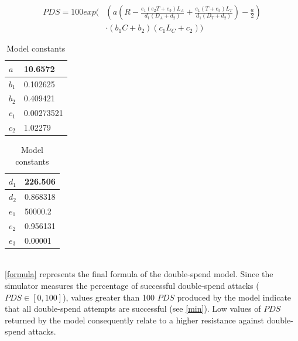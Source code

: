 \documentclass[a4paper,12pt,twoside]{report}
\begin{document}
\begin{equation}\label{formula}
\begin{split}
PDS = 100 exp \Biggl( & \left( a \left( R-\frac{e_1 \left( e_2T+e_3 \right) L_A}{d_1 \left( D_A+d_2 \right)}+\frac{e_1 \left( T+e_3 \right) L_T}{d_1 \left( D_T+d_2 \right)} \right) - \frac{a}{2} \right) \\
           & \cdot \left( b_1C+b_2 \right) \left( c_1L_C+c_2 \right) \Biggr)
\end{split}
\end{equation}
\begin{table}[hb!]
\centering
\begin{tabular}{|l|l|} \hline
$a$ & 10.6572 \\ \hline
$b_1$ & 0.102625 \\ \hline
$b_2$ & 0.409421 \\ \hline
$c_1$ & 0.00273521 \\ \hline
$c_2$ & 1.02279 \\ \hline
\end{tabular}
\begin{tabular}{|l|l|} \hline
$d_1$ & 226.506 \\ \hline
$d_2$ & 0.868318 \\ \hline
$e_1$ & 50000.2 \\ \hline
$e_2$ & 0.956131 \\ \hline
$e_3$ & 0.00001 \\ \hline
\end{tabular}
\caption{Model constants}
\label{constants}
\end{table}
\\
\autoref{formula} represents the final formula of the double-spend model. Since the simulator measures the percentage of successful double-spend attacks ($PDS \in [0, 100]$), values greater than 100 $PDS$ produced by the model indicate that all double-spend attempts are successful (see \autoref{min}). Low values of $PDS$ returned by the model consequently relate to a higher resistance against double-spend attacks.
\end{document}
